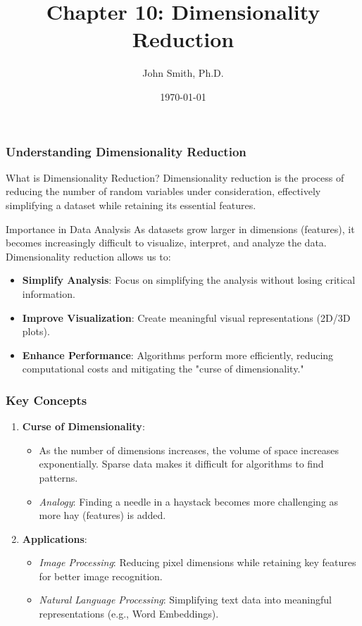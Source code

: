 \documentclass[aspectratio=169]{beamer}
\title[Dimensionality Reduction]{Chapter 10: Dimensionality Reduction}
\author[J. Smith]{John Smith, Ph.D.}
\institute[University Name]{
  Department of Computer Science\\
  University Name\\
  \vspace{0.3cm}
  Email: email@university.edu\\
  Website: www.university.edu
}
\date{\today}
\begin{document}
\frame{\titlepage}

\begin{frame}[fragile]
  \titlepage
\end{frame}

\begin{frame}[fragile]
    \frametitle{Understanding Dimensionality Reduction}
    
    \begin{block}{What is Dimensionality Reduction?}
        Dimensionality reduction is the process of reducing the number of random variables under consideration, effectively simplifying a dataset while retaining its essential features.
    \end{block}

    \begin{block}{Importance in Data Analysis}
        As datasets grow larger in dimensions (features), it becomes increasingly difficult to visualize, interpret, and analyze the data. Dimensionality reduction allows us to:
        \begin{itemize}
            \item \textbf{Simplify Analysis}: Focus on simplifying the analysis without losing critical information.
            \item \textbf{Improve Visualization}: Create meaningful visual representations (2D/3D plots).
            \item \textbf{Enhance Performance}: Algorithms perform more efficiently, reducing computational costs and mitigating the "curse of dimensionality."
        \end{itemize}
    \end{block}
\end{frame}

\begin{frame}[fragile]
    \frametitle{Key Concepts}
    
    \begin{enumerate}
        \item \textbf{Curse of Dimensionality}:
        \begin{itemize}
            \item As the number of dimensions increases, the volume of space increases exponentially. Sparse data makes it difficult for algorithms to find patterns.
            \item \textit{Analogy}: Finding a needle in a haystack becomes more challenging as more hay (features) is added.
        \end{itemize}
        
        \item \textbf{Applications}:
        \begin{itemize}
            \item \textit{Image Processing}: Reducing pixel dimensions while retaining key features for better image recognition.
            \item \textit{Natural Language Processing}: Simplifying text data into meaningful representations (e.g., Word Embeddings).
        \end{itemize}
    \end{enumerate}
\end{frame}
\end{document}

